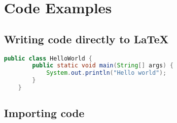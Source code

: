 \chapter{Code Examples}

\section{Writing code directly to LaTeX}
\begin{lstlisting}[caption=Manual input, label={listing-java-manual},language=java,style=skripsilisting]
	public class HelloWorld {
		public static void main(String[] args) {
			System.out.println("Hello world");
		}
	}
\end{lstlisting}

\section{Importing code}

